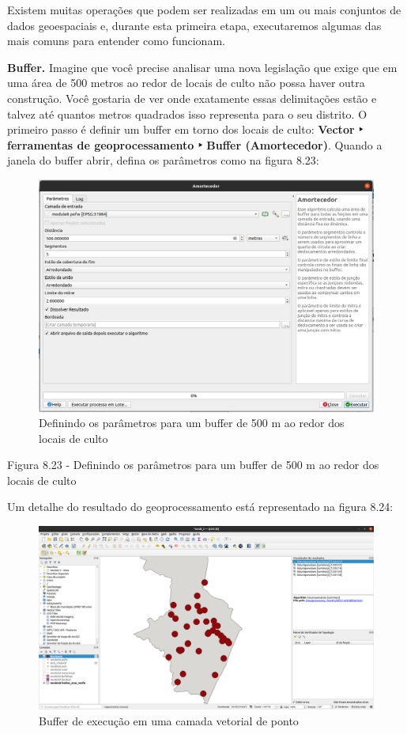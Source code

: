 \documentclass[
]{book}
\begin{document}
Existem muitas operações que podem ser realizadas em um ou mais conjuntos de dados geoespaciais e, durante esta primeira etapa, executaremos algumas das mais comuns para entender como funcionam.

\textbf{Buffer.} Imagine que você precise analisar uma nova legislação que exige que em uma área de 500 metros ao redor de locais de culto não possa haver outra construção. Você gostaria de ver onde exatamente essas delimitações estão e talvez até quantos metros quadrados isso representa para o seu distrito. O primeiro passo é definir um buffer em torno dos locais de culto: \textbf{Vector ‣ ferramentas de geoprocessamento ‣ Buffer (Amortecedor)}. Quando a janela do buffer abrir, defina os parâmetros como na figura 8.23:

\begin{figure}
\centering
\includegraphics{media/modulo8/fig823.png}
\caption{Definindo os parâmetros para um buffer de 500 m ao redor dos locais de culto}
\end{figure}

Figura 8.23 \hspace{0pt}\hspace{0pt}- Definindo os parâmetros para um buffer de 500 m ao redor dos locais de culto

Um detalhe do resultado do geoprocessamento está representado na figura 8.24:

\begin{figure}
\centering
\includegraphics{media/modulo8/fig824.png}
\caption{Buffer de execução em uma camada vetorial de ponto}
\end{figure}
\end{document}
